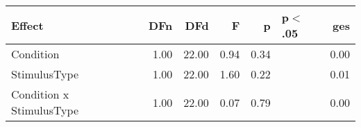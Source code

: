 \begin{table}[ht]
\centering
\begin{tabulary}{\textwidth}{lrrrrlr}
  \hline
Effect & DFn & DFd & F & p & p$<$.05 & ges \\ 
  \hline
Condition & 1.00 & 22.00 & 0.94 & 0.34 &  & 0.00 \\ 
  StimulusType & 1.00 & 22.00 & 1.60 & 0.22 &  & 0.01 \\ 
  Condition x StimulusType & 1.00 & 22.00 & 0.07 & 0.79 &  & 0.00 \\ 
   \hline
\end{tabulary}
\end{table}
